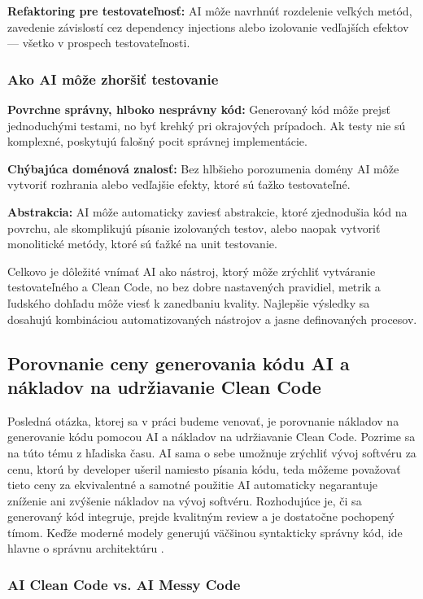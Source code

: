 \textbf{Refaktoring pre testovateľnosť:} AI môže navrhnúť rozdelenie veľkých metód, zavedenie závislostí cez dependency injections alebo izolovanie vedľajších efektov — všetko v prospech testovateľnosti.


\subsubsection{Ako AI môže zhoršiť testovanie}

\textbf{Povrchne správny, hlboko nesprávny kód:} Generovaný kód môže prejsť jednoduchými testami, no byť krehký pri okrajových prípadoch. Ak testy nie sú komplexné, poskytujú falošný pocit správnej implementácie.

\textbf{Chýbajúca doménová znalosť:} Bez hlbšieho porozumenia domény AI môže vytvoriť rozhrania alebo vedľajšie efekty, ktoré sú ťažko testovateľné.

\textbf{Abstrakcia:} AI môže automaticky zaviesť abstrakcie, ktoré zjednodušia kód na povrchu, ale skomplikujú písanie izolovaných testov, alebo naopak vytvoriť monolitické metódy, ktoré sú ťažké na unit testovanie.

Celkovo je dôležité vnímať AI ako nástroj, ktorý môže zrýchliť vytváranie testovateľného a Clean Code, no bez dobre nastavených pravidiel, metrik a ľudského dohľadu môže viesť k zanedbaniu kvality. Najlepšie výsledky sa dosahujú kombináciou automatizovaných nástrojov  a jasne definovaných procesov.

\subsection{Porovnanie ceny generovania kódu AI a nákladov na udržiavanie Clean Code}

Posledná otázka, ktorej sa v práci budeme venovať, je porovnanie nákladov na generovanie kódu pomocou AI a nákladov na udržiavanie Clean Code. Pozrime sa na túto tému z hľadiska času. AI sama o sebe  umožnuje zrýchliť vývoj softvéru za cenu, ktorú by developer ušeril namiesto písania kódu, teda môžeme považovať tieto ceny za ekvivalentné a samotné použitie AI automaticky negarantuje zníženie ani zvýšenie nákladov na vývoj softvéru. Rozhodujúce je, či sa generovaný kód integruje, prejde kvalitným review a je dostatočne pochopený tímom. Keďže moderné modely generujú väčšinou syntakticky správny kód, ide hlavne o správnu architektúru \cite{TECHNICALDEBT_2026}.

\subsubsection{AI Clean Code vs. AI Messy Code}

